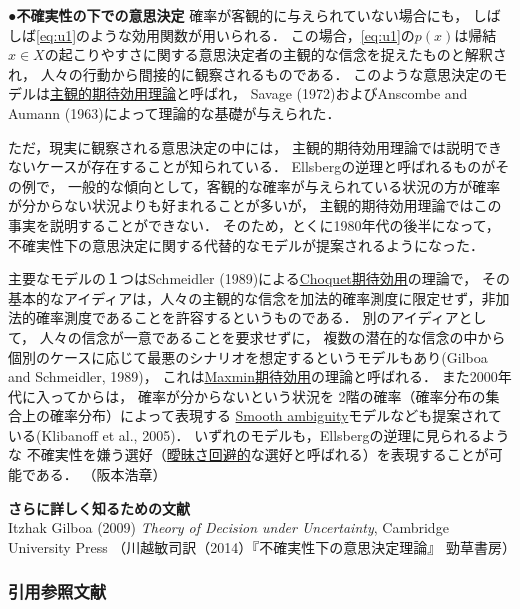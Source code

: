 \documentclass[11pt,a4paper]{article}
\begin{document}
\noindent\textbf{●不確実性の下での意思決定}\hspace{0.5em}
確率が客観的に与えられていない場合にも，
しばしば\eqref{eq:u1}のような効用関数が用いられる．
この場合，\eqref{eq:u1}の$p(x)$は帰結$x\in X$の起こりやすさに関する意思決定者の主観的な信念を捉えたものと解釈され，
人々の行動から間接的に観察されるものである．
このような意思決定のモデルは\underline{主観的期待効用理論}と呼ばれ，
Savage (1972)およびAnscombe and Aumann (1963)によって理論的な基礎が与えられた．

ただ，現実に観察される意思決定の中には，
主観的期待効用理論では説明できないケースが存在することが知られている．
Ellsbergの逆理と呼ばれるものがその例で，
一般的な傾向として，客観的な確率が与えられている状況の方が確率が分からない状況よりも好まれることが多いが，
主観的期待効用理論ではこの事実を説明することができない．
そのため，とくに1980年代の後半になって，不確実性下の意思決定に関する代替的なモデルが提案されるようになった．

主要なモデルの１つはSchmeidler (1989)による\underline{Choquet期待効用}の理論で，
その基本的なアイディアは，人々の主観的な信念を加法的確率測度に限定せず，非加法的確率測度であることを許容するというものである．
別のアイディアとして，
人々の信念が一意であることを要求せずに，
複数の潜在的な信念の中から個別のケースに応じて最悪のシナリオを想定するというモデルもあり(Gilboa and Schmeidler, 1989)，
これは\underline{Maxmin期待効用}の理論と呼ばれる．
また2000年代に入ってからは，
確率が分からないという状況を
2階の確率（確率分布の集合上の確率分布）によって表現する
\underline{Smooth ambiguity}モデルなども提案されている(Klibanoff et al., 2005)．
いずれのモデルも，Ellsbergの逆理に見られるような
不確実性を嫌う選好（\underline{曖昧さ回避的}な選好と呼ばれる）を表現することが可能である．
（阪本浩章）\vspace{5pt}

\noindent\textbf{さらに詳しく知るための文献}\hspace{0.5em}\\
Itzhak Gilboa (2009) \textit{Theory of Decision under Uncertainty},
Cambridge University Press （川越敏司訳（2014）『不確実性下の意思決定理論』 勁草書房）

\clearpage

\subsubsection*{引用参照文献}
\end{document}
